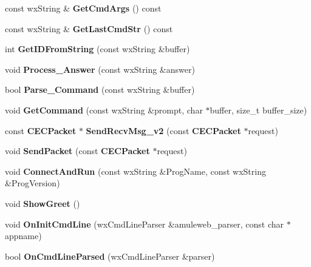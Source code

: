 \begin{DoxyCompactItemize}
\item 
const wxString \& {\bfseries GetCmdArgs} () const \label{classCaMuleExternalConnector_af026b970ac969b634c3551d97a247ea6}

\item 
const wxString \& {\bfseries GetLastCmdStr} () const \label{classCaMuleExternalConnector_abbd607aa6ec90f0dcca3987a90fc5130}

\item 
int {\bfseries GetIDFromString} (const wxString \&buffer)\label{classCaMuleExternalConnector_a6b943f99e0a98787ef46c928b3645373}

\item 
void {\bfseries Process\_\-Answer} (const wxString \&answer)\label{classCaMuleExternalConnector_a0f9201c1ed4969224ab7bb894afd70e3}

\item 
bool {\bfseries Parse\_\-Command} (const wxString \&buffer)\label{classCaMuleExternalConnector_a48dd4c4741e89e497b3c81cbd161e836}

\item 
void {\bfseries GetCommand} (const wxString \&prompt, char $\ast$buffer, size\_\-t buffer\_\-size)\label{classCaMuleExternalConnector_a2a878ab95ecb7121ec771c7cabbca6a6}

\item 
const {\bf CECPacket} $\ast$ {\bfseries SendRecvMsg\_\-v2} (const {\bf CECPacket} $\ast$request)\label{classCaMuleExternalConnector_a8f5f3e0ddb2c826adfea4af8e9a6308f}

\item 
void {\bfseries SendPacket} (const {\bf CECPacket} $\ast$request)\label{classCaMuleExternalConnector_a63209481cac88250fba9664be256d1de}

\item 
void {\bfseries ConnectAndRun} (const wxString \&ProgName, const wxString \&ProgVersion)\label{classCaMuleExternalConnector_a1c3f106375c8b8dfa154e7b80d6bfcba}

\item 
void {\bfseries ShowGreet} ()\label{classCaMuleExternalConnector_ac7acb240a11173b3a7820f25f3a89a78}

\item 
void {\bfseries OnInitCmdLine} (wxCmdLineParser \&amuleweb\_\-parser, const char $\ast$appname)\label{classCaMuleExternalConnector_a8abc62dea7c00d15c28d95aa051053c9}

\item 
bool {\bfseries OnCmdLineParsed} (wxCmdLineParser \&parser)\label{classCaMuleExternalConnector_a898ca42da5c284417754fa9fdbb0c15b}

\end{DoxyCompactItemize}
